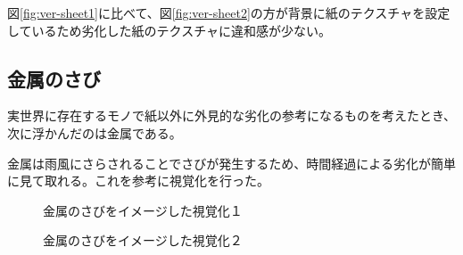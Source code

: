 図\ref{fig:ver-sheet1}に比べて、図\ref{fig:ver-sheet2}の方が背景に紙のテクスチャを設定しているため劣化した紙のテクスチャに違和感が少ない。

\subsection{金属のさび}
\label{subsec:ver-tex-russet}

実世界に存在するモノで紙以外に外見的な劣化の参考になるものを考えたとき、次に浮かんだのは金属である。

金属は雨風にさらされることでさびが発生するため、時間経過による劣化が簡単に見て取れる。これを参考に視覚化を行った。

\begin{figure}[htbp]
  \begin{minipage}{0.5\hsize}
    \begin{center}
    \end{center}
    \caption{金属のさびをイメージした視覚化１}
    \label{fig:ver-russet1}
  \end{minipage}
  \begin{minipage}{0.5\hsize}
    \begin{center}
    \end{center}
    \caption{金属のさびをイメージした視覚化２}
    \label{fig:ver-russet2}
  \end{minipage}
\end{figure}


